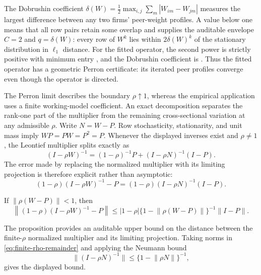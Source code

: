 The Dobrushin coefficient
$\delta(W)=\tfrac12\max_{i,j}\sum_m|W_{im}-W_{jm}|$ measures the largest
difference between any two firms' peer-weight profiles. A value below one means
that all row pairs retain some overlap and supplies the auditable envelope
$C=2$ and $q=\delta(W)$: every row of $W^k$ lies within
$2\delta(W)^k$ of the stationary distribution in $\ell_1$ distance.
For the fitted operator, the second power is strictly positive with minimum
entry , and the Dobrushin coefficient is
.
Thus the fitted operator has a geometric Perron certificate: its iterated peer
profiles converge even though the operator is directed.

The Perron limit describes the boundary $\rho\uparrow1$, whereas the empirical
application uses a finite working-model coefficient.
An exact decomposition separates the rank-one part of the multiplier from the
remaining cross-sectional variation at any admissible $\rho$.
Write $N=W-P$. Row stochasticity, stationarity, and unit mass imply
$WP=PW=P^2=P$. Whenever the displayed inverses exist and $\rho\neq1$, the
Leontief multiplier splits exactly as
\begin{equation}
  (I-\rho W)^{-1}
  =(1-\rho)^{-1}P+(I-\rho N)^{-1}(I-P).
  \label{eq:resolvent-split}
\end{equation}
The error made by replacing the normalized multiplier with its limiting
projection is therefore explicit rather than asymptotic:
\begin{equation}
  (1-\rho)(I-\rho W)^{-1}-P
  =(1-\rho)(I-\rho N)^{-1}(I-P).
  \label{eq:finite-rho-remainder}
\end{equation}

\begin{proposition}
  \label{prop:finite-rho-bound}
  If $\lVert\rho(W-P)\rVert<1$, then
  \[
    \left\lVert(1-\rho)(I-\rho W)^{-1}-P\right\rVert
    \leq
    |1-\rho|\{1-\lVert\rho(W-P)\rVert\}^{-1}\lVert I-P\rVert.
  \]
\end{proposition}
The proposition provides an auditable upper bound on the distance between the
finite-$\rho$ normalized multiplier and its limiting projection.
Taking norms in \eqref{eq:finite-rho-remainder} and applying the Neumann bound
\[
  \lVert(I-\rho N)^{-1}\rVert
  \leq\{1-\lVert\rho N\rVert\}^{-1},
\]
gives the displayed bound.

